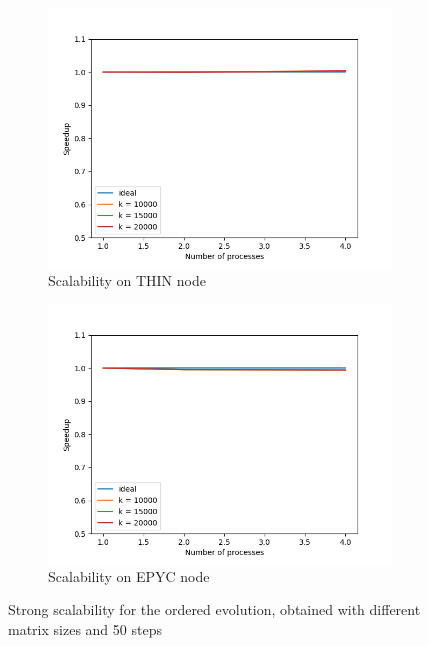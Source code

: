 \documentclass[12pt]{article}
\begin{document}
     \begin{figure}[h]
    	\centering
    	\begin{subfigure}[b]{0.4\textwidth}
    		\includegraphics[width = \textwidth]{figs1/Strong_scal_THIN_ordered.png}
    		\caption{Scalability on THIN node}
    		\label{fig:strong_o_thin}
    	\end{subfigure}
    	\begin{subfigure}[b]{0.4\textwidth}
    		\includegraphics[width = \textwidth]{figs1/Strong_scal_EPYC_ordered.png}
    		\caption{Scalability on EPYC node}
    		\label{fig:strong_o_epyc}
    	\end{subfigure}
    	\caption{Strong scalability for the ordered evolution, obtained with different matrix sizes and 50 steps}
    	\label{fig:strong_ordered}
    \end{figure}
    
\end{document}
